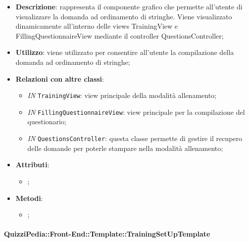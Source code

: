 		\begin{itemize}
			\item \textbf{Descrizione}: rappresenta il componente grafico che permette all'utente di visualizzare la domanda ad ordinamento di stringhe. Viene visualizzato dinamicamente all'interno delle views TrainingView e FillingQuestionnaireView mediante il controller QuestionsController;
			\item \textbf{Utilizzo}: viene utilizzato per consentire all'utente la compilazione della domanda ad ordinamento di stringhe;
			\item \textbf{Relazioni con altre classi}: 
			\begin{itemize}
				\item \textit{IN} \texttt{TrainingView}: view principale della modalità allenamento; 
				\item \textit{IN} \texttt{FillingQuestionnaireView}: view principale per la compilazione del questionario;
				\item \textit{IN} \texttt{QuestionsController}: questa classe permette di gestire il recupero delle domande per poterle stampare nella modalità allenamento;
			\end{itemize}
			\item \textbf{Attributi}: 
			\begin{itemize}
				\item ;
			\end{itemize}
			\item \textbf{Metodi}: 
			\begin{itemize}
				\item ;
			\end{itemize}
		\end{itemize}
		
		\paragraph{QuizziPedia::Front-End::Template::TrainingSetUpTemplate}
		
		\label{QuizziPedia::Front-End::Templates::TrainingSetUpTemplate}
		
